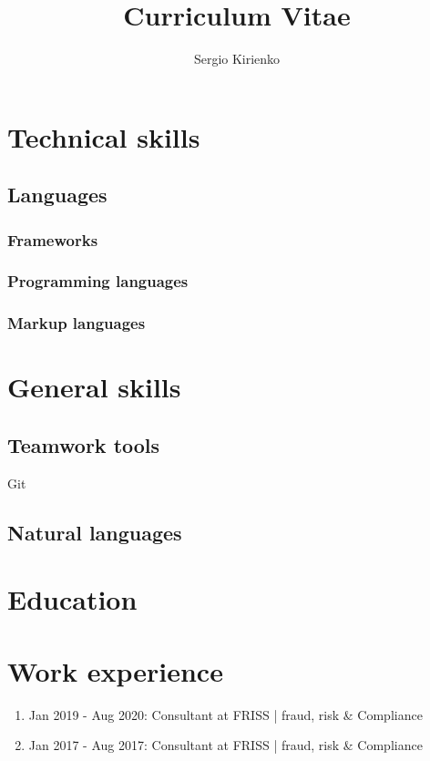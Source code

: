 \documentclass{article}
\begin{document}
\title{Curriculum Vitae}
\author{Sergio Kirienko}

\maketitle

\section{Technical skills}

\subsection{Languages}

\subsubsection{Frameworks}

\subsubsection{Programming languages}

\subsubsection{Markup languages}

\section{General skills}

\subsection{Teamwork tools}

Git

\subsection{Natural languages}



\section{Education}

\section{Work experience}

\begin{enumerate}
    \item Jan 2019 - Aug 2020: Consultant at FRISS | fraud, risk \& Compliance
    \item Jan 2017 - Aug 2017: Consultant at FRISS | fraud, risk \& Compliance
\end{enumerate}
\end{document}
